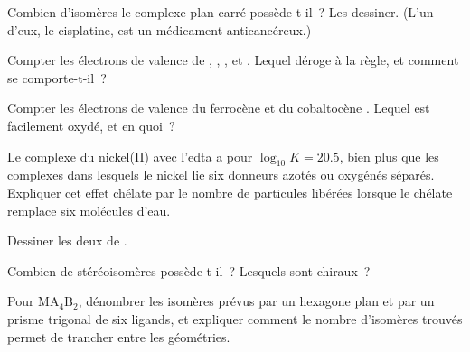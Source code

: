 \begin{exercise}[$\star\star$]\label{exo:b2:coordination-complexes:5}
Combien d'isomères le complexe plan carré \ce{[PtCl2(NH3)2]} possède-t-il~? Les dessiner. (L'un d'eux,
le cisplatine, est un médicament anticancéreux.)
\end{exercise}

\begin{exercise}[$\star\star$]\label{exo:b2:coordination-complexes:6}
Compter les électrons de valence de , , ,
 et . Lequel déroge à la règle, et comment se comporte-t-il~?
\end{exercise}

\begin{exercise}[$\star\star$]\label{exo:b2:coordination-complexes:7}
Compter les électrons de valence du ferrocène et du cobaltocène . Lequel est
facilement oxydé, et en quoi~?
\end{exercise}

\begin{exercise}[$\star\star$]\label{exo:b2:coordination-complexes:8}
Le complexe du nickel(II) avec l'edta a pour $\log_{10}K = 20.5$, bien plus que les complexes dans
lesquels le nickel lie six donneurs azotés ou oxygénés séparés. Expliquer cet effet chélate
par le nombre de particules libérées lorsque le chélate remplace six molécules
d'eau.
\end{exercise}

\begin{exercise}[$\star\star$]\label{exo:b2:coordination-complexes:9}
Dessiner les deux  de .
\end{exercise}

\begin{exercise}[$\star\star\star$]\label{exo:b2:coordination-complexes:10}
Combien de stéréoisomères \ce{[CoCl2(en)2]+} possède-t-il~? Lesquels sont chiraux~?
\end{exercise}

\begin{exercise}[$\star\star\star$]\label{exo:b2:coordination-complexes:11}
Pour $\mathrm{MA_4B_2}$, dénombrer les isomères prévus par un hexagone plan et par un prisme
trigonal de six ligands, et expliquer comment le nombre d'isomères trouvés permet de trancher entre les
géométries.
\end{exercise}

